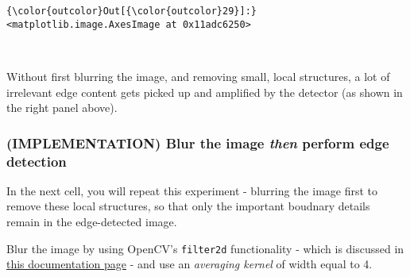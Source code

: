 \documentclass[11pt]{article}
\begin{document}
\begin{Verbatim}[commandchars=\\\{\}]
{\color{outcolor}Out[{\color{outcolor}29}]:} <matplotlib.image.AxesImage at 0x11adc6250>
\end{Verbatim}
            
    \begin{center}
    \end{center}
    { \hspace*{\fill} \\}
    
    Without first blurring the image, and removing small, local structures,
a lot of irrelevant edge content gets picked up and amplified by the
detector (as shown in the right panel above).

    \subsubsection{\texorpdfstring{(IMPLEMENTATION) Blur the image
\emph{then} perform edge
detection}{(IMPLEMENTATION) Blur the image then perform edge detection}}\label{implementation-blur-the-image-then-perform-edge-detection}

In the next cell, you will repeat this experiment - blurring the image
first to remove these local structures, so that only the important
boudnary details remain in the edge-detected image.

Blur the image by using OpenCV's \texttt{filter2d} functionality - which
is discussed in
\href{http://docs.opencv.org/3.1.0/d4/d13/tutorial_py_filtering.html}{this
documentation page} - and use an \emph{averaging kernel} of width equal
to 4.
\end{document}

